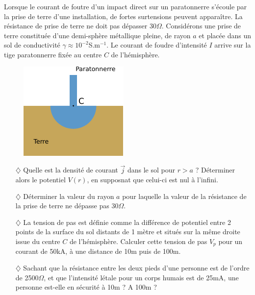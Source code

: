 \documentclass{report}
\begin{document}
Lorsque le courant de foutre d'un impact direct sur un paratonnerre s'écoule par la prise de terre d'une installation, de fortes surtensions peuvent apparaître. La résistance de prise de terre ne doit pas dépasser 30$\Omega$. Considérons une prise de terre constituée d'une demi-sphère métallique pleine, de rayon $a$ et placée dans un sol de conductivité $\gamma\approx10^{-2}$S.m$^{-1}$. Le courant de foudre d'intensité $I$ arrive sur la tige paratonnerre fixée au centre $C$ de l'hémisphère.

\begin{figure}[h!]
\centering
		\includegraphics[scale=1.5]{EM1.pdf}
\end{figure}

\begin{itemize}
	
	\item[$\diamondsuit$] Quelle est la densité de courant $\vec{j}$ dans le sol pour $r>a$ ? Déterminer alors le potentiel $V(r)$, en supposnat que celui-ci est nul à l'infini. 
	
	\item[$\diamondsuit$] Déterminer la valeur du rayon $a$ pour laquelle la valeur de la résistance de la prise de terre ne dépasse pas 30$\Omega$.
	
	\item[$\diamondsuit$] La tension de pas est définie comme la différence de potentiel entre 2 points de la surface du sol distants de 1 mètre et situés sur la même droite issue du centre $C$ de l'hémisphère. Calculer cette tension de pas $V_p$ pour un courant de 50kA, à une distance de 10m puis de 100m.
	
	\item[$\diamondsuit$] Sachant que la résistance entre les deux pieds d'une personne est de l'ordre de 2500$\Omega$, et que l'intensité létale pour un corps humais est de 25mA, une personne est-elle en sécurité à 10m ? A 100m ? 
	
\end{itemize} 
\end{document}
